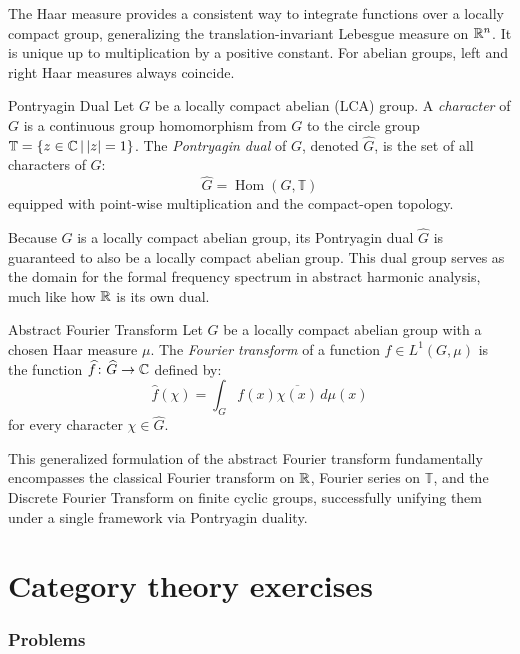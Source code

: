 \documentclass[a4paper]{article}
\begin{document}
The Haar measure provides a consistent way to integrate functions over a locally compact group, generalizing the translation-invariant Lebesgue measure on \(\mathbb{R}^n\). It is unique up to multiplication by a positive constant. For abelian groups, left and right Haar measures always coincide.

\begin{snippetdefinition}{Pontryagin Dual}
    Let \(G\) be a locally compact abelian (LCA) group. A \emph{character} of \(G\) is a continuous group homomorphism from \(G\) to the circle group \(\mathbb{T} = \{z \in \mathbb{C} \,|\, |z| = 1\}\).
    The \emph{Pontryagin dual} of \(G\), denoted \(\widehat{G}\), is the set of all characters of \(G\):
    \[
        \widehat{G} = \operatorname{Hom}(G, \mathbb{T})
    \]
    equipped with point-wise multiplication and the compact-open topology.
\end{snippetdefinition}

Because \(G\) is a locally compact abelian group, its Pontryagin dual \(\widehat{G}\) is guaranteed to also be a locally compact abelian group. This dual group serves as the domain for the formal frequency spectrum in abstract harmonic analysis, much like how \(\mathbb{R}\) is its own dual.

\begin{snippetdefinition}{Abstract Fourier Transform}
    Let \(G\) be a locally compact abelian group with a chosen Haar measure \(\mu\). The \emph{Fourier transform} of a function \(f \in L^1(G, \mu)\) is the function \(\widehat{f} \colon \widehat{G} \to \mathbb{C}\) defined by:
    \[
        \widehat{f}(\chi) = \int_G f(x) \overline{\chi(x)} \, d\mu(x)
    \]
    for every character \(\chi \in \widehat{G}\).
\end{snippetdefinition}

This generalized formulation of the abstract Fourier transform fundamentally encompasses the classical Fourier transform on \(\mathbb{R}\), Fourier series on \(\mathbb{T}\), and the Discrete Fourier Transform on finite cyclic groups, successfully unifying them under a single framework via Pontryagin duality.

\pagebreak

\part{Category theory exercises}

\section{Problems}
\end{document}

